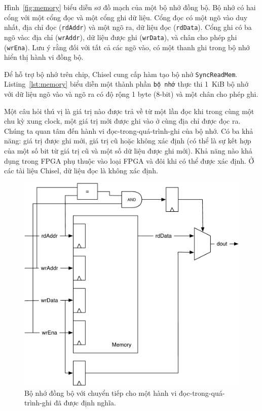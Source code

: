 \documentclass[%
    10pt,
    headinclude, footexclude,
    openright, %
    notitlepage,
    cleardoubleempty,
    headsepline,
    pointlessnumbers,
    bibtotoc, idxtotoc,
    ]{scrbook}
\newcommand{\code}[1]{{\small{\texttt{#1}}}}
\newcommand{\scale}{0.7}
\begin{document}
Hình~\ref{fig:memory} biểu diễn sơ đồ mạch của một bộ nhớ đồng bộ.
Bộ nhớ có hai cổng với một cổng đọc và một cổng ghi dữ liệu.
Cổng đọc có một ngõ vào duy nhất, địa chỉ đọc (\code{rdAddr}) và
một ngõ ra, dữ liệu đọc (\code{rdData}).
Cổng ghi có ba ngõ vào: địa chỉ (\code{wrAddr}), dữ liệu 
được ghi (\code{wrData}), và chân cho phép ghi (\code{wrEna}).
Lưu ý rằng đối với tất cả các ngõ vào, có một thanh ghi trong bộ nhớ hiển thị hành vi đồng bộ.


Để hỗ trợ bộ nhớ trên chip, Chisel cung cấp hàm tạo bộ nhớ \code{SyncReadMem}.
Listing~\ref{lst:memory} biểu diễn một thành phần \code{bộ nhớ} thực thi
1~KiB bộ nhớ với dữ liệu ngõ vào và ngõ ra có độ rộng 1 byte (8-bit) và một chân cho phép ghi.


Một câu hỏi thú vị là giá trị nào được trả về từ một lần đọc khi trong cùng một 
chu kỳ xung clock, một giá trị mới được ghi vào ở cùng địa chỉ được đọc ra.
Chúng ta quan tâm đến hành vi đọc-trong-quá-trình-ghi của bộ nhớ.
Có ba khả năng: giá trị được ghi mới, giá trị cũ hoặc không xác định 
(có thể là sự kết hợp của một số bit từ giá trị cũ và một số dữ liệu được ghi mới).
Khả năng nào khả dụng trong FPGA phụ thuộc vào loại FPGA và đôi khi có thể được xác định.
Ở các tài liệu Chisel, dữ liệu đọc là không xác định. 

\begin{figure}
  \centering
  \includegraphics[scale=\scale]{figures/memory-forwarding}
  \caption{Bộ nhớ đồng bộ với chuyển tiếp cho một hành vi đọc-trong-quá-trình-ghi đã được định nghĩa.}
  \label{fig:memory:forwarding}
\end{figure}
\end{document}
